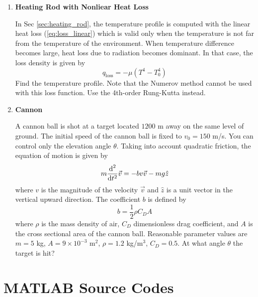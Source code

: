 \begin{enumerate}[labelwidth=0.5cm,labelindent=0cm,leftmargin=*,label=\bfseries \thechapter.\arabic*,align=left]

\item \textbf{Heating Rod with Nonliear Heat Loss}

In Sec \ref{sec:heating_rod}, the temperature profile is computed with  the linear heat loss (\ref{eq:loss_linear}) which is valid only when the temperature is not far from the temperature of the environment.  When temperature difference becomes large,  heat loss due to radiation becomes dominant.  In that case, the loss density is given by
\begin{equation}
q_\text{loss} = - \mu (T^4 - T_0^4)
\end{equation}
Find the temperature profile.  Note that the Numerov method cannot be used with this loss function. Use the 4th-order Rung-Kutta instead.

\item \textbf{Cannon}

\medskip
\noindent
A cannon ball is shot at a target located $1200$ m away on the same level of ground.  The initial speed of the cannon ball is fixed to $v_0=150$ m/s. You can control only the elevation angle $\theta$.  Taking into account quadratic friction, the equation of motion is given by
\begin{equation}\label{eq:projectile_quad_drag}
m \frac{\text{d}^2}{\text{d} t^2} \vec{v} = - b v \vec{v} - m g \hat{z}
\end{equation}
where $v$ is the magnitude of the velocity $\vec{v}$ and $\hat{z}$ is a unit vector in the vertical upward direction.  The coefficient $b$ is defined by 
\begin{equation}
b=\frac{1}{2} \rho C_D A
\end{equation}
where $\rho$ is the mass density of air, $C_D$ dimensionless drag coefficient, and $A$ is the cross sectional area of the cannon ball.  Reasonable parameter values are $m=5$ kg, $A=9 \times 10^{-3}$ m$^2$, $\rho=1.2$ kg/m$^3$, $C_D=0.5$. At what angle $\theta$ the target is hit?
\end{enumerate}


\newpage
\section*{MATLAB Source Codes}

\bigskip
\noindent
\program
\label{prog:air-rocket}

